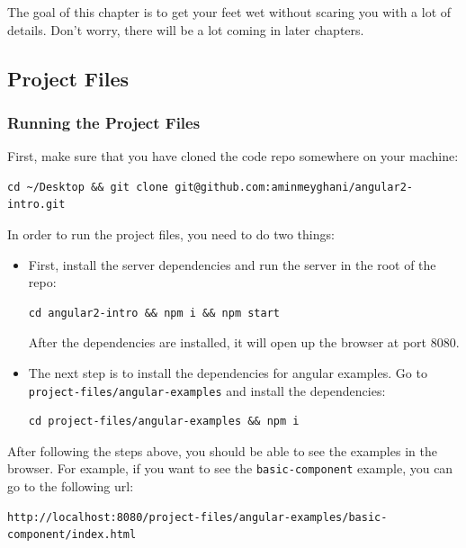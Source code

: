 \documentclass[12pt,]{article}
\begin{document}
The goal of this chapter is to get your feet wet without scaring you
with a lot of details. Don't worry, there will be a lot coming in later
chapters.

\subsection{Project Files}\label{project-files}

\hypertarget{running-the-project-files}{\subsubsection{Running the
Project Files}\label{running-the-project-files}}

First, make sure that you have cloned the code repo somewhere on your
machine:

\begin{verbatim}
cd ~/Desktop && git clone git@github.com:aminmeyghani/angular2-intro.git
\end{verbatim}

In order to run the project files, you need to do two things:

\begin{itemize}
\item
  First, install the server dependencies and run the server in the root
  of the repo:

\begin{verbatim}
cd angular2-intro && npm i && npm start
\end{verbatim}

  After the dependencies are installed, it will open up the browser at
  port 8080.
\item
  The next step is to install the dependencies for angular examples. Go
  to \texttt{project-files/angular-examples} and install the
  dependencies:

\begin{verbatim}
cd project-files/angular-examples && npm i
\end{verbatim}
\end{itemize}

After following the steps above, you should be able to see the examples
in the browser. For example, if you want to see the
\texttt{basic-component} example, you can go to the following url:

\begin{verbatim}
http://localhost:8080/project-files/angular-examples/basic-component/index.html
\end{verbatim}
\end{document}
